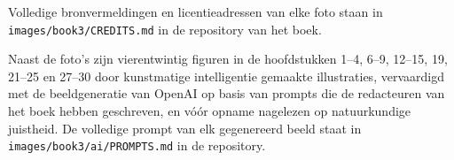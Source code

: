 Volledige bronvermeldingen en licentieadressen van elke foto staan in
\texttt{images/book3/CREDITS.md} in de repository van het boek.

\bigskip
Naast de foto's zijn vierentwintig figuren in de hoofdstukken 1--4,
6--9, 12--15, 19, 21--25 en 27--30 door kunstmatige intelligentie
gemaakte illustraties, vervaardigd met de beeldgeneratie van OpenAI op
basis van prompts die de redacteuren van het boek hebben geschreven,
en vóór opname nagelezen op natuurkundige juistheid. De volledige
prompt van elk gegenereerd beeld staat in
\texttt{images/book3/ai/PROMPTS.md} in de repository.
\clearpage
